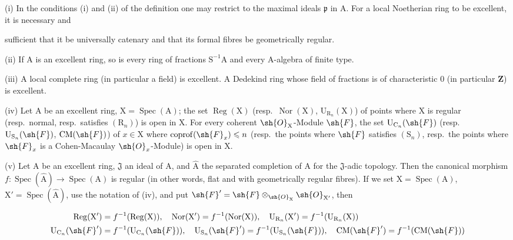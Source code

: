 \begin{scholium}[7.8.3]
\label{IV.7.8.3}
(i) In the conditions (i) and (ii) of the definition  one may restrict to the maximal ideals $\mathfrak{p}$ in $\mathrm{A}$. For a local Noetherian ring to be excellent, it is necessary and


sufficient that it be universally catenary and that its formal fibres be geometrically regular.

(ii) If $\mathrm{A}$ is an excellent ring, so is every ring of fractions $\mathrm{S}^{-1}\mathrm{A}$ and every $\mathrm{A}$-algebra of finite type.

(iii) A local complete ring (in particular a field) is excellent. A Dedekind ring whose field of fractions is of characteristic $0$ (in particular $\mathbf{Z}$) is excellent.

(iv) Let $\mathrm{A}$ be an excellent ring, $\mathrm{X}=\operatorname{Spec}(\mathrm{A})$; the set $\operatorname{Reg}(\mathrm{X})$ (resp.\ $\operatorname{Nor}(\mathrm{X})$, $\mathrm{U}_{\mathrm{R}_n}(\mathrm{X})$) of points where $\mathrm{X}$ is regular (resp.\ normal, resp.\ satisfies $(\mathrm{R}_n)$) is open in $\mathrm{X}$. For every coherent $\sh{O}_\mathrm{X}$-Module $\sh{F}$, the set $\mathrm{U}_{\mathrm{C}_n}(\sh{F})$ (resp.\ $\mathrm{U}_{\mathrm{S}_n}(\sh{F})$, $\mathrm{CM}(\sh{F})$) of $x\in\mathrm{X}$ where $\operatorname{coprof}(\sh{F}_x)\leqslant n$ (resp.\ the points where $\sh{F}$ satisfies $(\mathrm{S}_n)$, resp.\ the points where $\sh{F}_x$ is a Cohen-Macaulay $\sh{O}_x$-Module) is open in $\mathrm{X}$.

(v) Let $\mathrm{A}$ be an excellent ring, $\mathfrak{J}$ an ideal of $\mathrm{A}$, and $\widehat{\mathrm{A}}$ the separated completion of $\mathrm{A}$ for the $\mathfrak{J}$-adic topology. Then the canonical morphism $f:\operatorname{Spec}(\widehat{\mathrm{A}})\to\operatorname{Spec}(\mathrm{A})$ is regular (in other words, flat and with geometrically regular fibres). If we set $\mathrm{X}=\operatorname{Spec}(\mathrm{A})$, $\mathrm{X}'=\operatorname{Spec}(\widehat{\mathrm{A}})$, use the notation of (iv), and put $\sh{F}'=\sh{F}\otimes_{\sh{O}_\mathrm{X}}\sh{O}_{\mathrm{X}'}$, then

\begin{env}[7.8.3.1]
\label{IV.7.8.3.1}
\begin{align*}
  \operatorname{Reg}(\mathrm{X}')&=f^{-1}(\operatorname{Reg}(\mathrm{X})),\quad \operatorname{Nor}(\mathrm{X}')=f^{-1}(\operatorname{Nor}(\mathrm{X})),\quad \mathrm{U}_{\mathrm{R}_n}(\mathrm{X}')=f^{-1}(\mathrm{U}_{\mathrm{R}_n}(\mathrm{X}))\\
  \mathrm{U}_{\mathrm{C}_n}(\sh{F}')&=f^{-1}(\mathrm{U}_{\mathrm{C}_n}(\sh{F})),\quad \mathrm{U}_{\mathrm{S}_n}(\sh{F}')=f^{-1}(\mathrm{U}_{\mathrm{S}_n}(\sh{F})),\quad \mathrm{CM}(\sh{F}')=f^{-1}(\mathrm{CM}(\sh{F}))
\end{align*}
\end{env}


\end{scholium}
